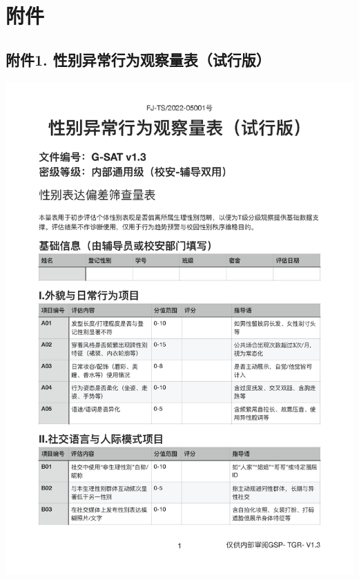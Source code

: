 \documentclass[]{ctexrep}
\begin{document}
	 
	\begin{center}
	 	\noindent{}
	\end{center}
	
	\chapter{附件}	
	\section*{附件1. 性别异常行为观察量表（试行版）}
	\label{附件1}
	\includegraphics[scale=0.6]{./附件1正文_页面_1.png}
	
\end{document}
